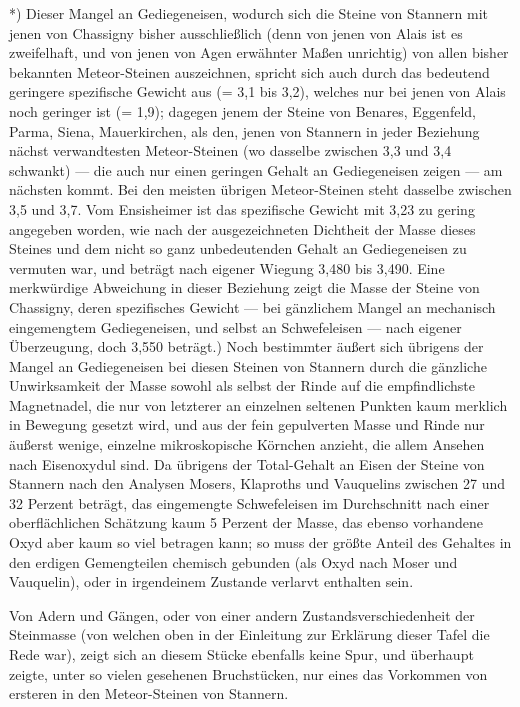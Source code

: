 \documentclass[a4paper, 11pt, oneside, german]{article}
\begin{document}
*) Dieser Mangel an Gediegeneisen, wodurch sich die Steine von Stannern mit jenen von Chassigny bisher ausschließlich (denn von jenen von Alais ist es zweifelhaft, und von jenen von Agen erwähnter Maßen unrichtig) von allen bisher bekannten Meteor-Steinen auszeichnen, spricht sich auch durch das bedeutend geringere spezifische Gewicht aus (= 3,1 bis 3,2), welches nur bei jenen von Alais noch geringer ist (= 1,9); dagegen jenem der Steine von Benares, Eggenfeld, Parma, Siena, Mauerkirchen, als den, jenen von Stannern in jeder Beziehung nächst verwandtesten Meteor-Steinen (wo dasselbe zwischen 3,3 und 3,4 schwankt) --- die auch nur einen geringen Gehalt an Gediegeneisen zeigen --- am nächsten kommt. Bei den meisten übrigen Meteor-Steinen steht dasselbe zwischen 3,5 und 3,7. Vom Ensisheimer ist das spezifische Gewicht mit 3,23 zu gering angegeben worden, wie nach der ausgezeichneten Dichtheit der Masse dieses Steines und dem nicht so ganz unbedeutenden Gehalt an Gediegeneisen zu vermuten war, und beträgt nach eigener Wiegung 3,480 bis 3,490. Eine merkwürdige Abweichung in dieser Beziehung zeigt die Masse der Steine von Chassigny, deren spezifisches Gewicht --- bei gänzlichem Mangel an mechanisch eingemengtem Gediegeneisen, und selbst an Schwefeleisen --- nach eigener Überzeugung, doch 3,550 beträgt.) Noch bestimmter äußert sich übrigens der Mangel an Gediegeneisen bei diesen Steinen von Stannern durch die gänzliche Unwirksamkeit der Masse sowohl als selbst der Rinde auf die empfindlichste Magnetnadel, die nur von letzterer an einzelnen seltenen Punkten kaum merklich in Bewegung gesetzt wird, und aus der fein gepulverten Masse und Rinde nur äußerst wenige, einzelne mikroskopische Körnchen anzieht, die allem Ansehen nach Eisenoxydul sind. Da übrigens der Total-Gehalt an Eisen der Steine von Stannern nach den Analysen Mosers, Klaproths und Vauquelins zwischen 27 und 32 Perzent beträgt, das eingemengte Schwefeleisen im Durchschnitt nach einer oberflächlichen Schätzung kaum 5 Perzent der Masse, das ebenso vorhandene Oxyd aber kaum so viel betragen kann; so muss der größte Anteil des Gehaltes in den erdigen Gemengteilen chemisch gebunden (als Oxyd nach Moser und Vauquelin), oder in irgendeinem Zustande verlarvt enthalten sein.

Von Adern und Gängen, oder von einer andern Zustandsverschiedenheit der Steinmasse (von welchen oben in der Einleitung zur Erklärung dieser Tafel die Rede war), zeigt sich an diesem Stücke ebenfalls keine Spur, und überhaupt zeigte, unter so vielen gesehenen Bruchstücken, nur eines das Vorkommen von ersteren in den Meteor-Steinen von Stannern.
\end{document}
